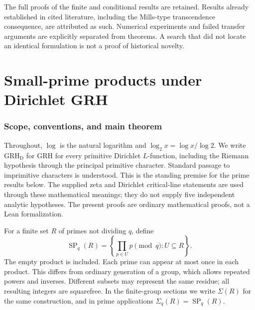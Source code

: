 \documentclass[11pt,a4paper]{article}
\theoremstyle{definition}
\theoremstyle{remark}
\begin{document}
The full proofs of the finite and conditional results are retained.
Results already established in cited literature, including the
Mills-type transcendence consequence, are attributed as such. Numerical
experiments and failed transfer arguments are explicitly separated from
theorems. A search that did not locate an identical formulation is not a
proof of historical novelty.

\clearpage
\begingroup
\small
\setlength{\parskip}{0pt}
\linespread{1}\selectfont
\tableofcontents
\endgroup
\clearpage
{}

\clearpage
\part{Small-prime products under Dirichlet GRH}\label{r-part-prime}


\providecommand{\pSP}{\operatorname{SP}}
\providecommand{\pGq}{(\mathbb Z/q\mathbb Z)^\times}
\providecommand{\pli}{\operatorname{li}}
\providecommand{\psupp}{\operatorname{supp}}
\providecommand{\pone}{\mathbf 1}
\providecommand{\pGRHD}{\mathrm{GRH}_{\mathrm D}}
\providecommand{\pStab}{\operatorname{Stab}}

\section{Scope, conventions, and main theorem}

Throughout, $\log$ is the natural logarithm and $\log_2 x=\log x/\log2$.
We write $\pGRHD$ for GRH for every primitive Dirichlet $L$-function,
including the Riemann hypothesis through the principal primitive
character. Standard passage to imprimitive characters is understood.
This is the standing premise for the prime results below. The supplied
zeta and Dirichlet critical-line statements are used through these
mathematical meanings; they do not supply five independent analytic
hypotheses. The present proofs are ordinary mathematical proofs, not
a Lean formalization.

For a finite set $R$ of primes not dividing $q$, define
\[
 \pSP_q(R)=\left\{\prod_{p\in U}p\pmod q:U\subseteq R\right\}.
\]
The empty product is included. Each prime can appear at most once in
each product. This differs from ordinary generation of a group, which
allows repeated powers and inverses. Different subsets may represent
the same residue; all resulting integers are squarefree. In the
finite-group sections we write $\Sigma(R)$ for the same construction,
and in prime applications $\Sigma_q(R)=\pSP_q(R)$.
\end{document}
